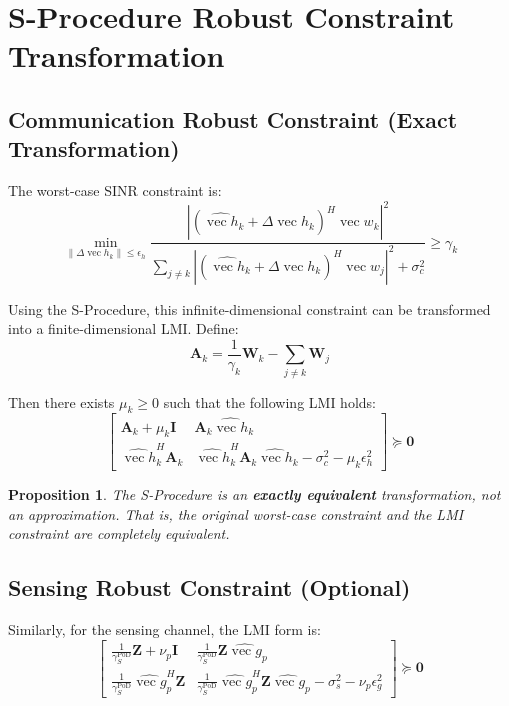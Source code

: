\documentclass[12pt,a4paper]{article}
\DeclareMathOperator{\vect}{vec}
\newcommand{\mat}[1]{\mathbf{#1}}
\newcommand{\norm}[1]{\left\|#1\right\|}
\newtheorem{proposition}{Proposition}
\begin{document}
\section{S-Procedure Robust Constraint Transformation}

\subsection{Communication Robust Constraint (Exact Transformation)}

The worst-case SINR constraint is:
\begin{equation}
\min_{\norm{\Delta\vect{h}_k} \leq \epsilon_h} \frac{|(\hat{\vect{h}}_k + \Delta\vect{h}_k)^H \vect{w}_k|^2}{\sum_{j \neq k} |(\hat{\vect{h}}_k + \Delta\vect{h}_k)^H \vect{w}_j|^2 + \sigma_c^2} \geq \gamma_k
\end{equation}

Using the S-Procedure, this infinite-dimensional constraint can be transformed into a finite-dimensional LMI. Define:
\begin{equation}
\mat{A}_k = \frac{1}{\gamma_k} \mat{W}_k - \sum_{j \neq k} \mat{W}_j
\end{equation}

Then there exists $\mu_k \geq 0$ such that the following LMI holds:
\begin{equation}
\begin{bmatrix} \mat{A}_k + \mu_k \mat{I} & \mat{A}_k \hat{\vect{h}}_k \\[1.5ex] \hat{\vect{h}}_k^H \mat{A}_k & \hat{\vect{h}}_k^H \mat{A}_k \hat{\vect{h}}_k - \sigma_c^2 - \mu_k \epsilon_h^2 \end{bmatrix} \succeq \mat{0} \tag{18}
\end{equation}

\begin{proposition}
The S-Procedure is an \textbf{exactly equivalent} transformation, not an approximation. That is, the original worst-case constraint and the LMI constraint are completely equivalent.
\end{proposition}

\subsection{Sensing Robust Constraint (Optional)}

Similarly, for the sensing channel, the LMI form is:
\begin{equation}
\begin{bmatrix} \frac{1}{\gamma_S^{\text{PoD}}} \mat{Z} + \nu_p \mat{I} & \frac{1}{\gamma_S^{\text{PoD}}} \mat{Z} \hat{\vect{g}}_p \\[1.5ex] \frac{1}{\gamma_S^{\text{PoD}}} \hat{\vect{g}}_p^H \mat{Z} & \frac{1}{\gamma_S^{\text{PoD}}} \hat{\vect{g}}_p^H \mat{Z} \hat{\vect{g}}_p - \sigma_s^2 - \nu_p \epsilon_g^2 \end{bmatrix} \succeq \mat{0} \tag{19}
\end{equation}
\end{document}
